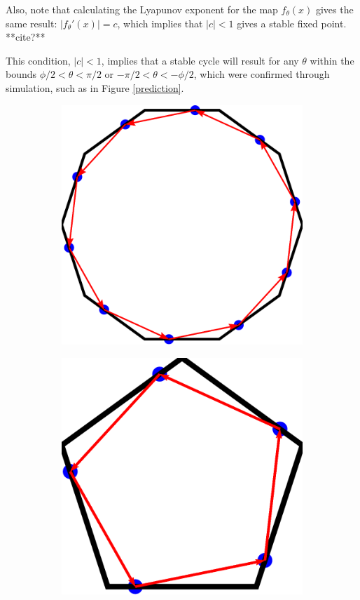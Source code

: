 \documentclass[letterpaper, 10 pt, conference]{ieeeconf}  %
\begin{document}
Also, note that calculating the Lyapunov exponent for the map $f_{\theta}(x)$
gives the same result: $|f_{\theta}'(x)| = c$, which implies that $|c| < 1$
gives a stable fixed point. **cite?**

This condition, $|c| < 1$, implies that a stable cycle will result for any
 $\theta$ within the bounds $\phi/2 < \theta < \pi/2$
or $-\pi/2 < \theta < -\phi/2$, which were confirmed through simulation, such as
in Figure \ref{prediction}.

\begin{figure}
\begin{subfigure}{.25\textwidth}
\centering

\includegraphics[width=0.9\linewidth]{figs/dec_limit_0pt2.pdf}

\end{subfigure}%
\begin{subfigure}{0.25\textwidth}

\includegraphics[width=0.9\linewidth]{figs/pent_limit_0pt5.pdf}


\end{subfigure}
\end{figure}
\end{document}
